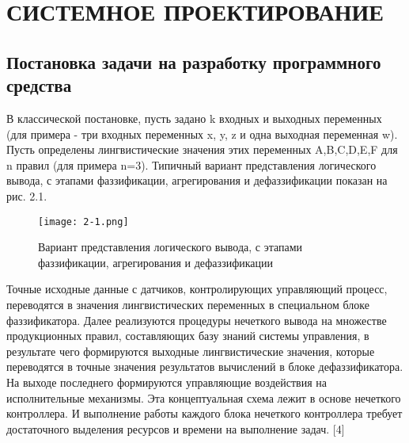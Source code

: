 \lstset{style=pythoninlinestyle}

\section{СИСТЕМНОЕ ПРОЕКТИРОВАНИЕ}
\label{sec:sys}

\subsection{Постановка задачи на разработку программного средства}
\label{sub:sys:1}

В классической постановке, пусть задано k входных и выходных   переменных (для примера - три входных переменных x, y, z и одна выходная переменная w). Пусть определены лингвистические значения этих переменных A,B,C,D,E,F для n правил (для примера n=3).  Типичный вариант представления логического вывода, с этапами фаззификации,  агрегирования и дефаззификации показан на рис. 2.1.

\begin{figure}[ht]
  \centering
  \texttt{[image: 2-1.png]}
  \caption{Вариант представления логического вывода, с этапами фаззификации,  агрегирования и дефаззификации }
  \label{fig:sys:1:1}
\end{figure}

Точные исходные данные с датчиков, контролирующих управляющий процесс, переводятся в значения лингвистических переменных в специальном блоке фаззификатора. Далее реализуются процедуры нечеткого вывода на множестве продукционных правил, составляющих базу знаний системы управления, в результате чего формируются выходные лингвистические значения, которые переводятся в точные значения результатов вычислений в блоке дефаззификатора. На выходе последнего формируются управляющие воздействия на исполнительные механизмы. Эта концептуальная схема лежит в основе нечеткого контроллера. И выполнение работы каждого блока нечеткого контроллера требует достаточного выделения ресурсов и времени на выполнение задач. [4]

